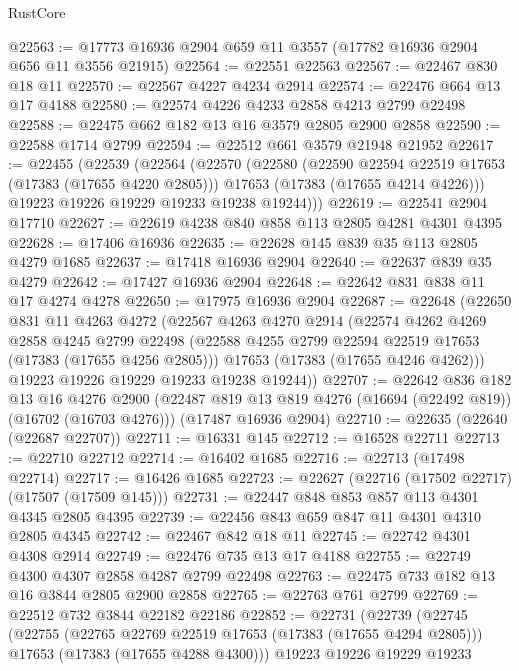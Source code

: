 \begin{lexlean}{RustCore}
\begin{coremodule}
@22563 := @17773 @16936 @2904 @659 @11 @3557 (@17782 @16936 @2904 @656 @11 @3556 @21915)
@22564 := @22551 @22563
@22567 := @22467 @830 @18 @11
@22570 := @22567 @4227 @4234 @2914
@22574 := @22476 @664 @13 @17 @4188
@22580 := @22574 @4226 @4233 @2858 @4213 @2799 @22498
@22588 := @22475 @662 @182 @13 @16 @3579 @2805 @2900 @2858
@22590 := @22588 @1714 @2799
@22594 := @22512 @661 @3579 @21948 @21952
@22617 := @22455
    (@22539
      (@22564
        (@22570
          (@22580
            (@22590 @22594 @22519 @17653 (@17383 (@17655 @4220 @2805)))
            @17653
            (@17383 (@17655 @4214 @4226)))
          @19223
          @19226
          @19229
          @19233
          @19238
          @19244)))
@22619 := @22541 @2904 @17710
@22627 := @22619 @4238 @840 @858 @113 @2805 @4281 @4301 @4395
@22628 := @17406 @16936
@22635 := @22628 @145 @839 @35 @113 @2805 @4279 @1685
@22637 := @17418 @16936 @2904
@22640 := @22637 @839 @35 @4279
@22642 := @17427 @16936 @2904
@22648 := @22642 @831 @838 @11 @17 @4274 @4278
@22650 := @17975 @16936 @2904
@22687 := @22648
    (@22650
      @831
      @11
      @4263
      @4272
      (@22567
        @4263
        @4270
        @2914
        (@22574
          @4262
          @4269
          @2858
          @4245
          @2799
          @22498
          (@22588 @4255 @2799 @22594 @22519 @17653 (@17383 (@17655 @4256 @2805)))
          @17653
          (@17383 (@17655 @4246 @4262)))
        @19223
        @19226
        @19229
        @19233
        @19238
        @19244))
@22707 := @22642
    @836
    @182
    @13
    @16
    @4276
    @2900
    (@22487 @819 @13 @819 @4276 (@16694 (@22492 @819)) (@16702 (@16703 @4276)))
    (@17487 @16936 @2904)
@22710 := @22635 (@22640 (@22687 @22707))
@22711 := @16331 @145
@22712 := @16528 @22711
@22713 := @22710 @22712
@22714 := @16402 @1685
@22716 := @22713 (@17498 @22714)
@22717 := @16426 @1685
@22723 := @22627 (@22716 (@17502 @22717) (@17507 (@17509 @145)))
@22731 := @22447 @848 @853 @857 @113 @4301 @4345 @2805 @4395
@22739 := @22456 @843 @659 @847 @11 @4301 @4310 @2805 @4345
@22742 := @22467 @842 @18 @11
@22745 := @22742 @4301 @4308 @2914
@22749 := @22476 @735 @13 @17 @4188
@22755 := @22749 @4300 @4307 @2858 @4287 @2799 @22498
@22763 := @22475 @733 @182 @13 @16 @3844 @2805 @2900 @2858
@22765 := @22763 @761 @2799
@22769 := @22512 @732 @3844 @22182 @22186
@22852 := @22731
    (@22739
      (@22745
        (@22755
          (@22765 @22769 @22519 @17653 (@17383 (@17655 @4294 @2805)))
          @17653
          (@17383 (@17655 @4288 @4300)))
        @19223
        @19226
        @19229
        @19233

\end{coremodule}
\end{lexlean}
